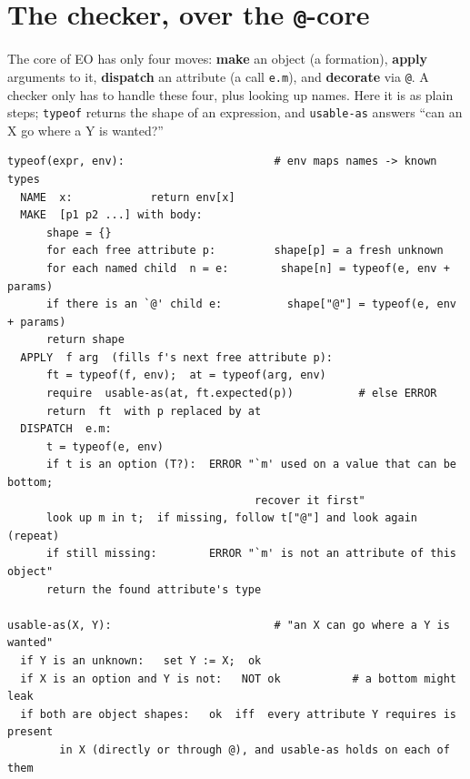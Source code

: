 \documentclass[10pt]{article}
\begin{document}
\section{The checker, over the \texttt{@}-core}\label{sec:checker}

The core of EO has only four moves: \textbf{make} an object (a formation),
\textbf{apply} arguments to it, \textbf{dispatch} an attribute (a call
\verb|e.m|), and \textbf{decorate} via \texttt{@}. A checker only has to handle
these four, plus looking up names. Here it is as plain steps; \verb|typeof|
returns the shape of an expression, and \verb|usable-as| answers ``can an X go
where a Y is wanted?''

\begin{lstlisting}
typeof(expr, env):                       # env maps names -> known types
  NAME  x:            return env[x]
  MAKE  [p1 p2 ...] with body:
      shape = {}
      for each free attribute p:         shape[p] = a fresh unknown
      for each named child  n = e:        shape[n] = typeof(e, env + params)
      if there is an `@' child e:          shape["@"] = typeof(e, env + params)
      return shape
  APPLY  f arg  (fills f's next free attribute p):
      ft = typeof(f, env);  at = typeof(arg, env)
      require  usable-as(at, ft.expected(p))          # else ERROR
      return  ft  with p replaced by at
  DISPATCH  e.m:
      t = typeof(e, env)
      if t is an option (T?):  ERROR "`m' used on a value that can be bottom;
                                      recover it first"
      look up m in t;  if missing, follow t["@"] and look again (repeat)
      if still missing:        ERROR "`m' is not an attribute of this object"
      return the found attribute's type

usable-as(X, Y):                         # "an X can go where a Y is wanted"
  if Y is an unknown:   set Y := X;  ok
  if X is an option and Y is not:   NOT ok           # a bottom might leak
  if both are object shapes:   ok  iff  every attribute Y requires is present
        in X (directly or through @), and usable-as holds on each of them
\end{lstlisting}
\end{document}
